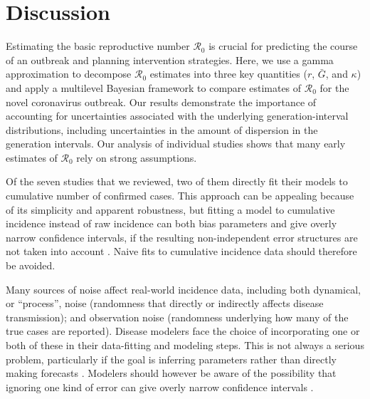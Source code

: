 \documentclass[12pt]{article}
\newcommand{\Ro}{\ensuremath{{\mathcal R}_{0}}\xspace}
\begin{document}
\section{Discussion}

Estimating the basic reproductive number \Ro is crucial for predicting the course of an outbreak and planning intervention strategies.
Here, we use a gamma approximation \citep{park2019practical} to decompose \Ro estimates into three key quantities ($r$, $\bar G$, and $\kappa$) and apply a multilevel Bayesian framework to compare estimates of \Ro for the novel coronavirus outbreak.
Our results demonstrate the importance of accounting for uncertainties associated with the underlying generation-interval distributions, including uncertainties in the amount of dispersion in the generation intervals.
Our analysis of individual studies shows that many early estimates of \Ro rely on strong assumptions.

Of the seven studies that we reviewed, two of them directly fit their models to cumulative number of confirmed cases.
This approach can be appealing because of its simplicity and apparent robustness, but fitting a model to cumulative incidence instead of raw incidence can both bias parameters and give overly narrow confidence intervals, if the resulting non-independent error structures are not taken into account \citep{ma2014estimating, king2015avoidable}.
Naive fits to cumulative incidence data should therefore be avoided.

Many sources of noise affect real-world incidence data, including both dynamical, or ``process'', noise (randomness that directly or indirectly affects disease transmission); and observation noise (randomness underlying how many of the true cases are reported).  
Disease modelers face the choice of incorporating one or both of these in their data-fitting and modeling steps. 
This is not always a serious problem, particularly if the goal is inferring parameters rather than directly making forecasts \citep{ma2014estimating}.
Modelers should however be aware of the possibility that ignoring one kind of error can give overly narrow confidence intervals \citep{king2015avoidable,taylor2016stochasticity}.
\end{document}

